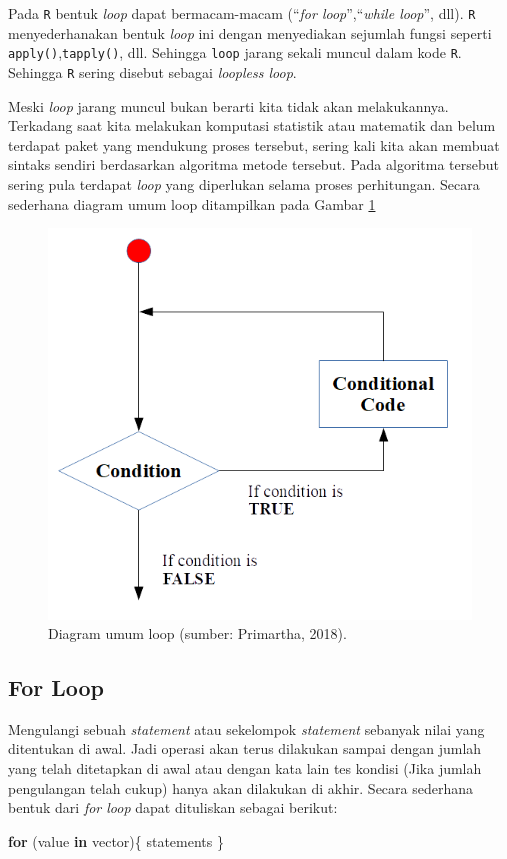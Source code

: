 \documentclass[]{book}
\newenvironment{Shaded}{\begin{snugshade}}{\end{snugshade}}
\newcommand{\ControlFlowTok}[1]{\textcolor[rgb]{0.13,0.29,0.53}{\textbf{#1}}}
\newcommand{\NormalTok}[1]{#1}
\begin{document}
Pada \texttt{R} bentuk \emph{loop} dapat bermacam-macam (``\emph{for
loop}'',``\emph{while loop}'', dll). \texttt{R} menyederhanakan bentuk
\emph{loop} ini dengan menyediakan sejumlah fungsi seperti
\texttt{apply()},\texttt{tapply()}, dll. Sehingga \texttt{loop} jarang
sekali muncul dalam kode \texttt{R}. Sehingga \texttt{R} sering disebut
sebagai \emph{loopless loop}.

Meski \emph{loop} jarang muncul bukan berarti kita tidak akan
melakukannya. Terkadang saat kita melakukan komputasi statistik atau
matematik dan belum terdapat paket yang mendukung proses tersebut,
sering kali kita akan membuat sintaks sendiri berdasarkan algoritma
metode tersebut. Pada algoritma tersebut sering pula terdapat
\emph{loop} yang diperlukan selama proses perhitungan. Secara sederhana
diagram umum loop ditampilkan pada Gambar \ref{fig:loop}

\begin{figure}

{\centering \includegraphics[width=0.4\linewidth]{skema_loop} 

}

\caption{Diagram umum loop (sumber: Primartha, 2018).}\label{fig:loop}
\end{figure}

\subsection{For Loop}\label{for-loop}

Mengulangi sebuah \emph{statement} atau sekelompok \emph{statement}
sebanyak nilai yang ditentukan di awal. Jadi operasi akan terus
dilakukan sampai dengan jumlah yang telah ditetapkan di awal atau dengan
kata lain tes kondisi (Jika jumlah pengulangan telah cukup) hanya akan
dilakukan di akhir. Secara sederhana bentuk dari \emph{for loop} dapat
dituliskan sebagai berikut:

\begin{Shaded}
\begin{Highlighting}[]
\ControlFlowTok{for}\NormalTok{ (value }\ControlFlowTok{in}\NormalTok{ vector)\{}
\NormalTok{  statements}
\NormalTok{\}}
\end{Highlighting}
\end{Shaded}
\end{document}

